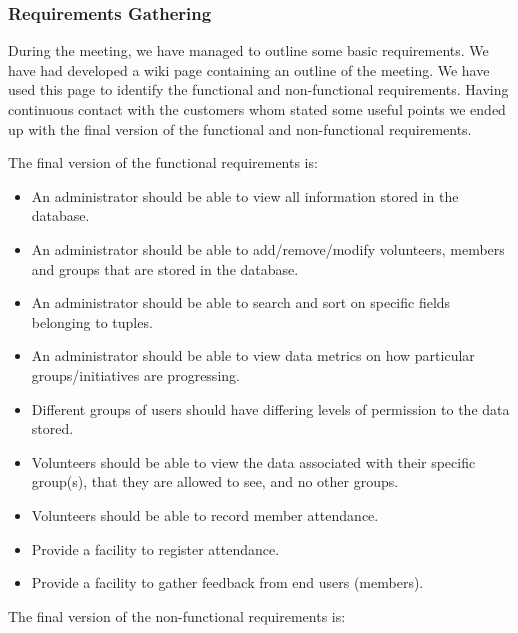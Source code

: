 \documentclass{l3proj}
\begin{document}
\subsubsection{Requirements Gathering}
\label{requirements}

During the meeting, we have managed to outline some basic requirements. We have had developed a wiki page containing an outline of the meeting. We have used this page to identify the functional and non-functional requirements. Having continuous contact with the customers whom stated some useful points we ended up with the final version of the functional and non-functional requirements. 

The final version of the functional requirements is:
\begin{itemize}

\item An administrator should be able to view all information stored in the database.

\item An administrator should be able to add/remove/modify volunteers, members and groups that are stored in the database.

\item An administrator should be able to search and sort on specific fields belonging to tuples.

\item An administrator should be able to view data metrics on how particular groups/initiatives are progressing.

\item Different groups of users should have differing levels of permission to the data stored.

\item Volunteers should be able to view the data associated with their specific group(s), that they are allowed to see, and no other groups.

\item Volunteers should be able to record member attendance.

\item Provide a facility to register attendance.

\item Provide a facility to gather feedback from end users (members).

\end{itemize}

The final version of the non-functional requirements is:
\end{document}
